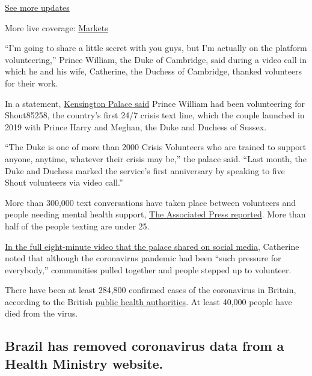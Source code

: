 \href{https://www.nytimes3xbfgragh.onion/2020/09/11/world/covid-19-coronavirus.html?action=click\&pgtype=Article\&state=default\&region=MAIN_CONTENT_1\&context=storylines_live_updates}{See
more updates}

More live coverage:
\href{https://www.nytimes3xbfgragh.onion/live/2020/09/11/business/stock-market-today-coronavirus?action=click\&pgtype=Article\&state=default\&region=MAIN_CONTENT_1\&context=storylines_live_updates}{Markets}

``I'm going to share a little secret with you guys, but I'm actually on
the platform volunteering,'' Prince William, the Duke of Cambridge, said
during a video call in which he and his wife, Catherine, the Duchess of
Cambridge, thanked volunteers for their work.

In a statement,
\href{https://www.royal.uk/duke-and-duchess-cambridge-thank-volunteers}{Kensington
Palace said} Prince William had been volunteering for Shout85258, the
country's first 24/7 crisis text line, which the couple launched in 2019
with Prince Harry and Meghan, the Duke and Duchess of Sussex.

``The Duke is one of more than 2000 Crisis Volunteers who are trained to
support anyone, anytime, whatever their crisis may be,'' the palace
said. ``Last month, the Duke and Duchess marked the service's first
anniversary by speaking to five Shout volunteers via video call.''

More than 300,000 text conversations have taken place between volunteers
and people needing mental health support,
\href{https://apnews.com/526a713bd3d291c9023ed2f61cd64e41}{The
Associated Press reported}. More than half of the people texting are
under 25.

\href{https://www.youtube.com/watch?v=tGdL9zfdE1Q}{In the full
eight-minute video that the palace shared on social media}, Catherine
noted that although the coronavirus pandemic had been ``such pressure
for everybody,'' communities pulled together and people stepped up to
volunteer.

There have been at least 284,800 confirmed cases of the coronavirus in
Britain, according to the British
\href{https://coronavirus.data.gov.uk/}{public health authorities}. At
least 40,000 people have died from the virus.

\hypertarget{brazil-has-removed-coronavirus-data-from-a-health-ministry-website}{%
\subsection{Brazil has removed coronavirus data from a Health Ministry
website.}\label{brazil-has-removed-coronavirus-data-from-a-health-ministry-website}}

